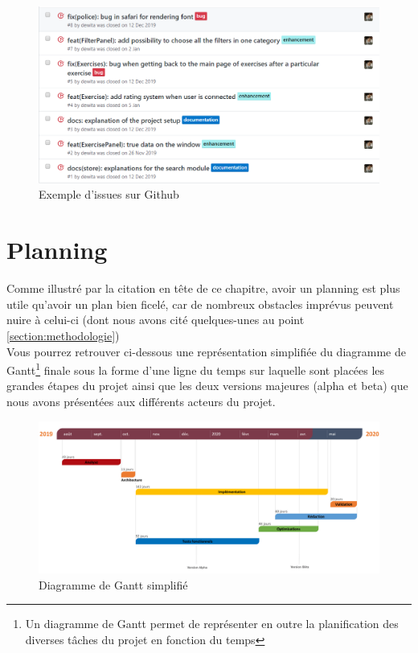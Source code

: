 \begin{figure}[H]
    \includegraphics[width=\textwidth,height=\textheight,keepaspectratio]{images/issueList.PNG}
    \centering
    \caption{Exemple d'issues sur Github}
    \label{pic:GithubIssues}
\end{figure}

\section{Planning}
Comme illustré par la citation en tête de ce chapitre, avoir un planning est plus utile qu'avoir un plan bien ficelé, car de nombreux obstacles imprévus peuvent nuire à celui-ci (dont nous avons cité quelques-unes au point  \ref{section:methodologie})\\

Vous pourrez retrouver ci-dessous une représentation simplifiée du diagramme de Gantt\footnote{Un diagramme de Gantt permet de représenter en outre la planification des diverses tâches du projet en fonction du temps } finale sous la forme d'une ligne du temps sur laquelle sont placées les grandes étapes du projet ainsi que les deux versions majeures (alpha et beta) que nous avons présentées aux différents acteurs du projet.\\

\begin{figure}[H]
    \includegraphics[width=\textwidth,height=\textheight,keepaspectratio]{images/planning.png}
    \centering
    \caption{Diagramme de Gantt simplifié}
    \label{pic:ganttChart}
\end{figure}

